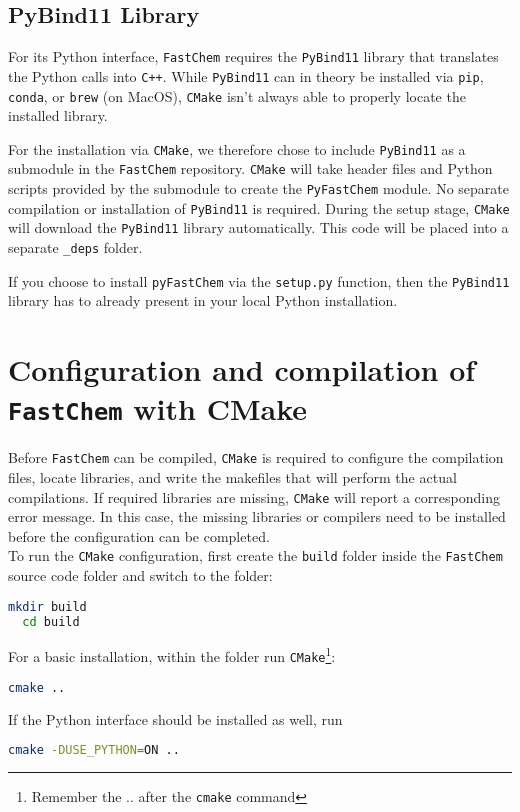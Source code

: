 \documentclass[numbers=noenddot]{aux/fcmanual}
\newcommand{\fc}{\texttt{FastChem}\xspace}
\newcommand{\pfc}{\texttt{pyFastChem}\xspace}
\newcommand{\cpp}{\ttt{C++}\xspace}
\newcommand{\pb}{\texttt{PyBind11}\xspace}
\newcommand{\ttt}[1]{\texttt {#1}}
\begin{document}
\subsection{PyBind11 Library}

For its Python interface, \fc requires the \pb library that translates the Python calls into \cpp. While \pb can in theory be installed via \texttt{pip}, \texttt{conda}, or \texttt{brew} (on MacOS), \texttt{CMake} isn't always able to properly locate the installed library. 

For the installation via \texttt{CMake}, we therefore chose to include \pb as a submodule in the \fc repository. \texttt{CMake} will take header files and Python scripts provided by the submodule to create the \texttt{PyFastChem} module. No separate compilation or installation of \pb is required. During the setup stage, \texttt{CMake} will download the \pb library automatically. This code will be placed into a separate \texttt{\_deps} folder.

If you choose to install \pfc via the \verb|setup.py| function, then the \pb library has to already present in your local Python installation.


\section{Configuration and compilation of \fc with CMake}
\label{sec:install_config}

Before \fc can be compiled, \texttt{CMake} is required to configure the compilation files, locate libraries, and write the makefiles that will perform the actual compilations. If required libraries are missing, \texttt{CMake} will report a corresponding error message. In this case, the missing libraries or compilers need to be installed before the configuration can be completed.\\

To run the \ttt{CMake} configuration, first create the \texttt{build} folder inside the \fc source code folder and switch to the folder:
\begin{lstlisting}[language=bash]
  mkdir build
  cd build
\end{lstlisting}
For a basic installation, within the folder run \texttt{CMake}\footnote{Remember the .. after the \texttt{cmake} command}:
\begin{lstlisting}[language=bash]
  cmake ..
\end{lstlisting}

If the Python interface should be installed as well, run
\begin{lstlisting}[language=bash]
  cmake -DUSE_PYTHON=ON ..
\end{lstlisting}
\end{document}
